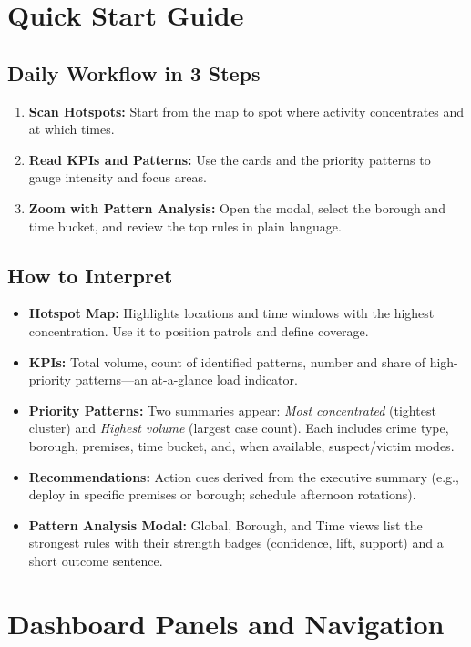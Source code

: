 \documentclass[11pt]{article}
\begin{document}
\section{Quick Start Guide}

\subsection{Daily Workflow in 3 Steps}
\begin{enumerate}
  \item \textbf{Scan Hotspots:} Start from the map to spot where activity concentrates and at which times.
  \item \textbf{Read KPIs and Patterns:} Use the cards and the priority patterns to gauge intensity and focus areas.
  \item \textbf{Zoom with Pattern Analysis:} Open the modal, select the borough and time bucket, and review the top rules in plain language.
\end{enumerate}

\subsection{How to Interpret}
\begin{itemize}[leftmargin=*]
  \item \textbf{Hotspot Map:} Highlights locations and time windows with the highest concentration. Use it to position patrols and define coverage.
  \item \textbf{KPIs:} Total volume, count of identified patterns, number and share of high-priority patterns---an at-a-glance load indicator.
  \item \textbf{Priority Patterns:} Two summaries appear: \emph{Most concentrated} (tightest cluster) and \emph{Highest volume} (largest case count). Each includes crime type, borough, premises, time bucket, and, when available, suspect/victim modes.
  \item \textbf{Recommendations:} Action cues derived from the executive summary (e.g., deploy in specific premises or borough; schedule afternoon rotations).
  \item \textbf{Pattern Analysis Modal:} Global, Borough, and Time views list the strongest rules with their strength badges (confidence, lift, support) and a short outcome sentence.
\end{itemize}

\section{Dashboard Panels and Navigation}
\end{document}
